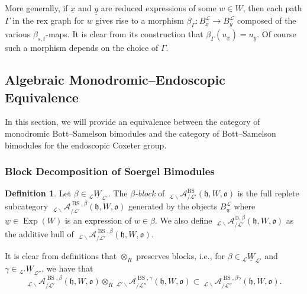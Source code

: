 \documentclass{amsart}
\newcommand{\scrL}{\mathcal{L}}
\newcommand{\fr}[1]{\mathfrak{#1}}
\DeclareMathOperator{\BS}{BS}
\newcommand{\Amon}[2]{\:_{#1 \backslash} \mathcal{A}_{/ #2} }
\DeclareMathOperator{\Exp}{Exp}
\newcommand{\uW}[2]{{}_{#1}\underline{W}_{#2}}
\newcommand{\uw}{\underline{w}}
\newcommand{\ux}{\underline{x}}
\newcommand{\uy}{\underline{y}}
\theoremstyle{definition}
\newtheorem{definition}[subsubsection]{Definition}
\numberwithin{equation}{subsection}
\begin{document}
More generally, if $\ux$ and $\uy$ are reduced expressions of some $w\in W$, then each path $\Gamma$ in the rex graph for $w$ gives rise to a morphism $\beta_{\Gamma} : B_{\ux}^{\scrL} \to B_{\uy}^{\scrL}$
composed of the various $\beta_{s,t}$-maps.
It is clear from its construction that $\beta_{\Gamma} (u_{\ux}) = u_{\uy}$. Of course such a morphism depends on the choice of $\Gamma$.

\subsection{Algebraic Monodromic--Endoscopic Equivalence} 

In this section, we will provide an equivalence between the category of monodromic Bott--Samelson bimodules and the category of Bott--Samelson bimodules for the endoscopic Coxeter group.

\subsubsection{Block Decomposition of Soergel Bimodules}

\begin{definition}
    Let $\beta \in \uW{\scrL}{\scrL'}$. The \emph{$\beta$-block} of $\Amon{\scrL}{\scrL'}^{\BS} (\fr{h}, W, \fr{o})$ is the full replete subcategory $\Amon{\scrL}{\scrL'}^{\BS, \beta} (\fr{h}, W, \fr{o})$ generated by the objects $B_{\uw}^{\scrL}$ where $\uw \in \Exp (W)$ is an expression of $w \in \beta$.
    We also define $\Amon{\scrL}{\scrL'}^{\oplus, \beta} (\fr{h}, W, \fr{o})$ as the additive hull of $\Amon{\scrL}{\scrL'}^{\BS, \beta} (\fr{h}, W, \fr{o})$.
\end{definition}

It is clear from definitions that $\otimes_R$ preserves blocks, i.e., for $\beta \in \uW{\scrL}{\scrL'}$ and $\gamma \in \uW{\scrL'}{\scrL''}$, we have that 
\begin{equation}\label{eq:abe_conv_presrves_blocks}
    \Amon{\scrL}{\scrL'}^{\BS, \beta} (\fr{h}, W, \fr{o}) \otimes_R \Amon{\scrL'}{\scrL''}^{\BS, \gamma} (\fr{h}, W, \fr{o}) \subset \Amon{\scrL}{\scrL''}^{\BS, \beta \gamma} (\fr{h}, W, \fr{o}).
\end{equation}
\end{document}

